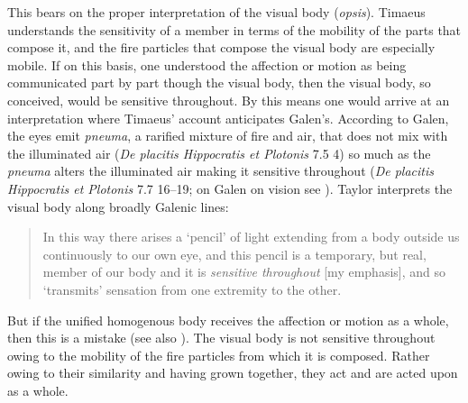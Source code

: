 This bears on the proper interpretation of the visual body (\emph{opsis}). Timaeus understands the sensitivity of a member in terms of the mobility of the parts that compose it, and the fire particles that compose the visual body are especially mobile. If on this basis, one understood the affection or motion as being communicated part by part though the visual body, then the visual body, so conceived, would be sensitive throughout. By this means one would arrive at an interpretation where Timaeus' account anticipates Galen's. According to Galen, the eyes emit \emph{pneuma}, a rarified mixture of fire and air, that does not mix with the illuminated air (\emph{De placitis Hippocratis et Plotonis} 7.5 4) so much as the \emph{pneuma} alters the illuminated air making it sensitive throughout (\emph{De placitis Hippocratis et Plotonis} 7.7 16--19; on Galen on vision see \citealt{Ierodiakonou:2014rj}). Taylor interprets the visual body along broadly Galenic lines:
\begin{quote}
	In this way there arises a `pencil' of light extending from a body outside us continuously to our own eye, and this pencil is a temporary, but real, member of our body and it is \emph{sensitive throughout} [my emphasis], and so `transmits' sensation from one extremity to the other. \citep[278]{Taylor:1928qb}
\end{quote}
But if the unified homogenous body receives the affection or motion as a whole, then this is a mistake (see also \citealt[153 n1]{Cornford:1935fk}). The visual body is not sensitive throughout owing to the mobility of the fire particles from which it is composed. Rather owing to their similarity and having grown together, they act and are acted upon as a whole.

